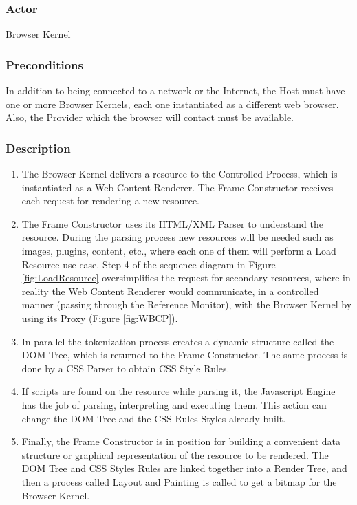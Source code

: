 \documentclass[]{acmlarge}
\begin{document}
    \subsubsection*{Actor} Browser Kernel
    \subsubsection*{Preconditions} In addition to being connected to a network or the Internet, the Host must have one or more Browser Kernels, each one instantiated as a different web browser. Also, the Provider which the browser will contact must be available. 

    \subsubsection*{Description}
      \begin{enumerate}\leftskip2.5em
        \item The Browser Kernel delivers a resource to the Controlled Process, which is instantiated as a Web Content Renderer. The Frame Constructor receives each request for rendering a new resource.
        \item The Frame Constructor uses its HTML/XML Parser to understand the resource. During the parsing process new resources will be needed such as images, plugins, content, etc., where each one of them will perform a Load Resource use case. Step 4 of the sequence diagram in Figure \ref{fig:LoadResource} oversimplifies the request for secondary resources, where in reality the Web Content Renderer would communicate, in a controlled manner (passing through the Reference Monitor), with the Browser Kernel by using its Proxy (Figure \ref{fig:WBCP}).
        \item In parallel the tokenization process creates a dynamic structure called the DOM Tree, which is returned to the Frame Constructor. The same process is done by a CSS Parser to obtain CSS Style Rules.
        \item If scripts are found on the resource while parsing it, the Javascript Engine has the job of parsing, interpreting and executing them. This action can change the DOM Tree and the CSS Rules Styles already built.
        \item Finally, the Frame Constructor is in position for building a convenient data structure or graphical representation of the resource to be rendered. The DOM Tree and CSS Styles Rules are linked together into a Render Tree, and then a process called Layout and Painting is called to get a bitmap \cite{gpuchrome,gecko2} for the Browser Kernel.
      \end{enumerate}
\end{document}
